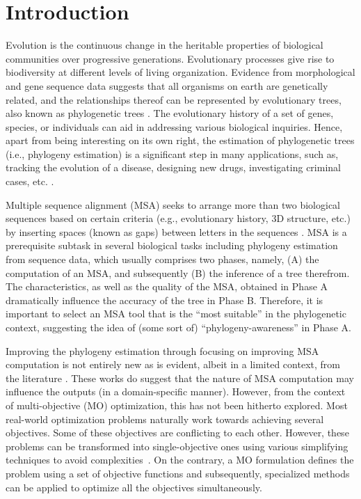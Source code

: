 \chapter{Introduction}
\label{ch:introduction}
Evolution is the continuous change in the heritable properties of biological communities over progressive generations. Evolutionary processes give rise to biodiversity at different levels of living organization.
Evidence from morphological and gene sequence data suggests that all organisms on earth are genetically related, and the relationships thereof can be represented by evolutionary trees, also known as phylogenetic trees \cite{warnow2017computational}. The evolutionary history of a set of genes, species, or individuals can aid in addressing various biological inquiries. Hence, apart from being interesting on its own right, the estimation of phylogenetic trees (i.e., phylogeny estimation) is a significant step in many applications, such as, tracking the evolution of a disease, designing new drugs, investigating criminal cases, etc. \cite{bush1999predicting, aluru2005handbook}.

Multiple sequence alignment (MSA) seeks to arrange more than two biological sequences based on certain criteria (e.g., evolutionary history, 3D structure, etc.) by inserting spaces (known as gaps) between letters in the sequences \cite{warnow2017computational}. MSA is a prerequisite subtask in several biological tasks including phylogeny estimation from sequence data, which usually comprises two phases, namely, (A) the computation of an MSA, and subsequently (B) the inference of a tree therefrom. The characteristics, as well as the quality of the MSA, obtained in Phase A dramatically influence the accuracy of the tree in Phase B. Therefore, it is important to select an MSA tool that is the “most suitable” in the phylogenetic context, suggesting the idea of (some sort of) “phylogeny-awareness” in Phase A.

Improving the phylogeny estimation through focusing on improving MSA computation is not entirely new as is evident, albeit in a limited context, from the literature \cite{redelings2005joint, ashkenazy2018multiple, warnow2013large}. These works do suggest that the nature of MSA computation may influence the outputs (in a domain-specific manner). However, from the context of multi-objective (MO) optimization, this has not been hitherto explored. Most real-world optimization problems naturally work towards achieving several objectives. Some of these objectives are conflicting to each other. However, these problems can be transformed into single-objective ones using various simplifying techniques to avoid complexities~\citep{kalyanmoy2001multi}. On the contrary, a MO formulation defines the problem using a set of objective functions and subsequently, specialized methods can be applied to optimize all the objectives simultaneously.

